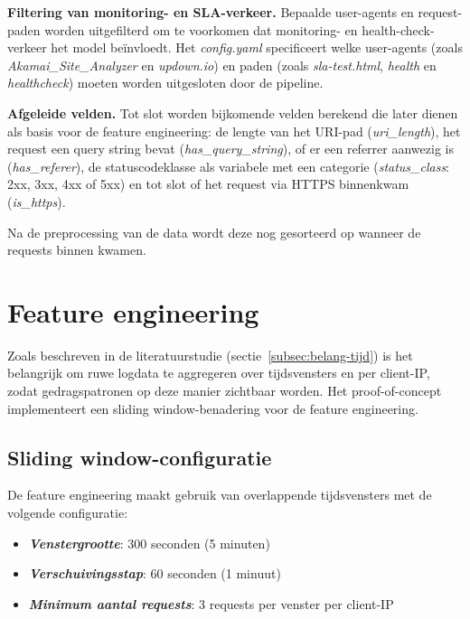 \textbf{Filtering van monitoring- en SLA-verkeer.} Bepaalde user-agents en request-paden worden uitgefilterd om te voorkomen dat monitoring- en health-check-verkeer het model beïnvloedt. Het \textit{config.yaml} specificeert welke user-agents (zoals \textit{Akamai\_Site\_Analyzer} en \textit{updown.io}) en paden (zoals \textit{sla-test.html}, \textit{health} en \textit{healthcheck}) moeten worden uitgesloten door de pipeline.

\textbf{Afgeleide velden.} Tot slot worden bijkomende velden berekend die later dienen als basis voor de feature engineering: de lengte van het URI-pad (\textit{uri\_length}), het request een query string bevat (\textit{has\_query\_string}), of er een referrer aanwezig is (\textit{has\_referer}), de statuscodeklasse als variabele met een categorie (\textit{status\_class}: 2xx, 3xx, 4xx of 5xx) en tot slot of het request via HTTPS binnenkwam (\textit{is\_https}).



Na de preprocessing van de data wordt deze nog gesorteerd op wanneer de requests binnen kwamen. 

\section{Feature engineering} 
\label{sec:feature-engineering}

Zoals beschreven in de literatuurstudie (sectie~\ref{subsec:belang-tijd}) is het belangrijk om ruwe logdata te aggregeren over tijdsvensters en per client-IP, zodat gedragspatronen op deze manier zichtbaar worden. Het proof-of-concept implementeert een sliding window-benadering voor de feature engineering.

\subsection{Sliding window-configuratie} 
\label{subsec:sliding-window-configuratie}

De feature engineering maakt gebruik van overlappende tijdsvensters met de volgende configuratie:

\begin{itemize}
    \item \textbf{\textit{Venstergrootte}}: 300 seconden (5 minuten)
    \item \textbf{\textit{Verschuivingsstap}}: 60 seconden (1 minuut)
    \item \textbf{\textit{Minimum aantal requests}}: 3 requests per venster per client-IP
\end{itemize}


